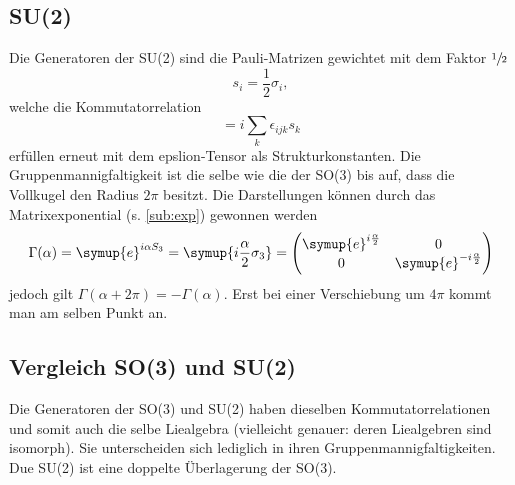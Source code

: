 \documentclass[
  captions=tableheading,  %
  titlepage=firstiscover, %
]{scrartcl}
\begin{document}
\subsection{SU(2)}
Die Generatoren der SU(2) sind die Pauli-Matrizen gewichtet mit dem Faktor $\sfrac{1}{2}$
\begin{equation*}
  s_i = \frac{1}{2} \sigma_i,
\end{equation*}
welche die Kommutatorrelation 
\begin{equation*}
  [s_i, s_j] = i \sum_k \epsilon_{ijk} s_k
\end{equation*}
erfüllen erneut mit dem epslion-Tensor als Strukturkonstanten.
Die Gruppenmannigfaltigkeit ist die selbe wie die der SO(3) bis auf, dass die Vollkugel den Radius $2\pi$ besitzt.
Die Darstellungen können durch das Matrixexponential (s. \ref{sub:exp}) gewonnen werden
\begin{equation*}
  \Gamma(\alpha) = \symup{e}^{i\alpha S_3} = \symup{i\frac{\alpha}{2}\sigma_3} = 
  \begin{pmatrix}
    \symup{e}^{i\frac{\alpha}{2}} & 0                               \\
    0                             & \symup{e}^{-i\frac{\alpha}{2}}  \\
  \end{pmatrix}
\end{equation*}
jedoch gilt $\Gamma(\alpha + 2\pi) = - \Gamma(\alpha)$.
Erst bei einer Verschiebung um $4\pi$ kommt man am selben Punkt an.
\subsection{Vergleich SO(3) und SU(2)}
Die Generatoren der SO(3) und SU(2) haben dieselben Kommutatorrelationen und somit auch die selbe Liealgebra
(vielleicht genauer: deren Liealgebren sind isomorph). 
Sie unterscheiden sich lediglich in ihren Gruppenmannigfaltigkeiten.
Due SU(2) ist eine doppelte Überlagerung der SO(3).
\end{document}
